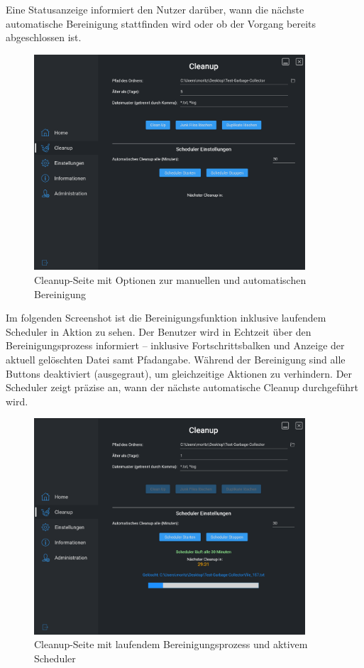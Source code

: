Eine Statusanzeige informiert den Nutzer darüber, wann die nächste automatische Bereinigung stattfinden wird oder ob der Vorgang bereits abgeschlossen ist.

\begin{figure}[H]
    \centering
    \includegraphics[width=0.9\textwidth]{src/screenshot_cleanup.png}
    \caption{Cleanup-Seite mit Optionen zur manuellen und automatischen Bereinigung}
\end{figure}

Im folgenden Screenshot ist die Bereinigungsfunktion inklusive laufendem Scheduler in Aktion zu sehen. Der Benutzer wird in Echtzeit über den Bereinigungsprozess informiert – inklusive Fortschrittsbalken und Anzeige der aktuell gelöschten Datei samt Pfadangabe. Während der Bereinigung sind alle Buttons deaktiviert (ausgegraut), um gleichzeitige Aktionen zu verhindern. Der Scheduler zeigt präzise an, wann der nächste automatische Cleanup durchgeführt wird.

\begin{figure}[H]
    \centering
    \includegraphics[width=0.9\textwidth]{src/screenshot_action.png}
    \caption{Cleanup-Seite mit laufendem Bereinigungsprozess und aktivem Scheduler}
\end{figure}

